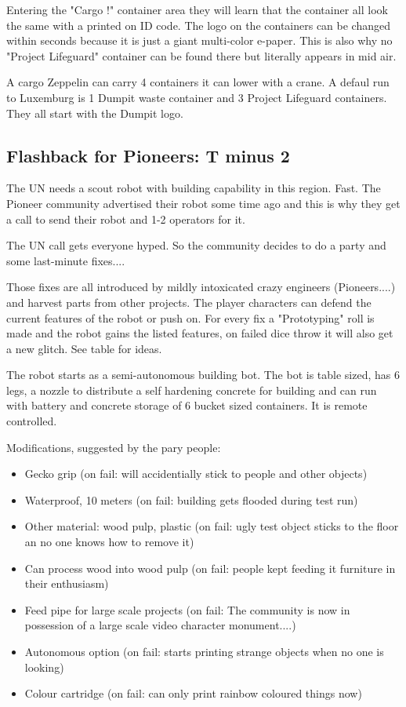 Entering the "Cargo !" container area they will learn that the container all look the same with a printed on ID code. The logo on the containers can be changed within seconds because it is just a giant multi-color e-paper. This is also why no "Project Lifeguard" container can be found there but literally appears in mid air.

A cargo Zeppelin can carry 4 containers it can lower with a crane. A defaul run to Luxemburg is 1 Dumpit waste container and 3 Project Lifeguard containers. They all start with the Dumpit logo.

\subsection{Flashback for Pioneers: T minus 2}

The UN needs a scout robot with building capability in this region. Fast. The Pioneer community advertised their robot some time ago and this is why they get a call to send their robot and 1-2 operators for it.

The UN call gets everyone hyped. So the community decides to do a party and some last-minute fixes....

Those fixes are all introduced by mildly intoxicated crazy engineers (Pioneers....) and harvest parts from other projects. The player characters can defend the current features of the robot or push on. For every fix a "Prototyping" roll is made and the robot gains the listed features, on failed dice throw it will also get a new glitch. See table for ideas.

The robot starts as a semi-autonomous building bot. The bot is table sized, has 6 legs, a nozzle to distribute a self hardening concrete for building and can run with battery and concrete storage of 6 bucket sized containers. It is remote controlled.

Modifications, suggested by the pary people:

\begin{itemize}
    \item Gecko grip (on fail: will accidentially stick to people and other objects)
    \item Waterproof, 10 meters (on fail: building gets flooded during test run)    
    \item Other material: wood pulp, plastic (on fail: ugly test object sticks to the floor an no one knows how to remove it)
    \item Can process wood into wood pulp (on fail: people kept feeding it furniture in their enthusiasm)
    \item Feed pipe for large scale projects (on fail: The community is now in possession of a large scale video character monument....)
    \item Autonomous option (on fail: starts printing strange objects when no one is looking)
    \item Colour cartridge (on fail: can only print rainbow coloured things now)
\end{itemize}

